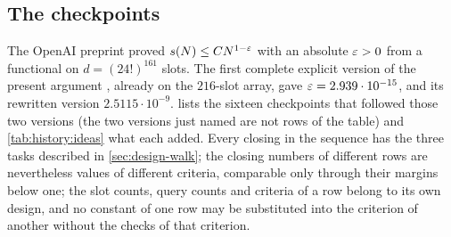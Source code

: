 \subsection{The checkpoints}\label{subsec:history:checkpoints}

The OpenAI preprint \cite{OpenAI} proved $s(N)\le CN^{1-\varepsilon}$ with an
absolute $\varepsilon>0$ from a functional on $d=(24!)^{161}$ slots. The first
complete explicit version of the present argument \cite{PartI}, already on
the $216$-slot array, gave $\varepsilon=2.939\cdot10^{-15}$, and its rewritten
version $2.5115\cdot10^{-9}$. 
lists the sixteen checkpoints that followed those two versions
(the two versions just named are not rows of the table) and
\cref{tab:history:ideas} what each added. Every
closing in the sequence has the three tasks described in
\cref{sec:design-walk}; the closing numbers of different rows are nevertheless
values of different criteria, comparable only through their margins below
one; the slot counts, query
counts and criteria of a row belong to its own design, and no constant of one
row may be substituted into the criterion of another without the checks of
that criterion.

